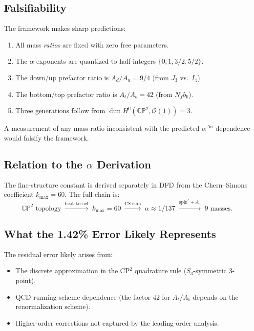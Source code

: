 \documentclass[11pt,a4paper]{article}
\newcommand{\CP}{\mathbb{CP}}
\theoremstyle{remark}
\begin{document}
\subsection{Falsifiability}

The framework makes sharp predictions:
\begin{enumerate}
\item All mass \emph{ratios} are fixed with zero free parameters.
\item The $\alpha$-exponents are quantized to half-integers $\{0, 1, 3/2, 5/2\}$.
\item The down/up prefactor ratio is $A_d/A_u = 9/4$ (from $J_3$ vs.\ $I_4$).
\item The bottom/top prefactor ratio is $A_t/A_b = 42$ (from $N_f b_0$).
\item Three generations follow from $\dim H^0(\CP^2, \mathcal{O}(1)) = 3$.
\end{enumerate}

A measurement of any mass ratio inconsistent with the predicted
$\alpha^{\Delta n}$ dependence would falsify the framework.

\subsection{Relation to the $\alpha$ Derivation}

The fine-structure constant is derived separately in DFD from the
Chern--Simons coefficient $k_{\max} = 60$.  The full chain is:
\[
\CP^2 \text{ topology}
\;\xrightarrow{\text{heat kernel}}\; k_{\max} = 60
\;\xrightarrow{\text{CS sum}}\; \alpha \approx 1/137
\;\xrightarrow{\text{spin}^c + A_5}\; \text{9 masses}.
\]

\subsection{What the 1.42\% Error Likely Represents}

The residual error likely arises from:
\begin{itemize}
\item The discrete approximation in the CP$^2$ quadrature rule
  ($S_3$-symmetric 3-point).
\item QCD running scheme dependence (the factor 42 for $A_t/A_b$ depends
  on the renormalization scheme).
\item Higher-order corrections not captured by the leading-order analysis.
\end{itemize}
\end{document}
